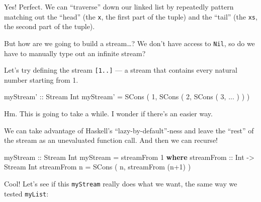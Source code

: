 \documentclass[]{article}
\newenvironment{Shaded}{}{}
\newcommand{\KeywordTok}[1]{\textcolor[rgb]{0.00,0.44,0.13}{\textbf{{#1}}}}
\newcommand{\DataTypeTok}[1]{\textcolor[rgb]{0.56,0.13,0.00}{{#1}}}
\newcommand{\DecValTok}[1]{\textcolor[rgb]{0.25,0.63,0.44}{{#1}}}
\newcommand{\OtherTok}[1]{\textcolor[rgb]{0.00,0.44,0.13}{{#1}}}
\newcommand{\FunctionTok}[1]{\textcolor[rgb]{0.02,0.16,0.49}{{#1}}}
\newcommand{\NormalTok}[1]{{#1}}
\begin{document}
Yes! Perfect. We can ``traverse'' down our linked list by repeatedly
pattern matching out the ``head'' (the \texttt{x}, the first part of the
tuple) and the ``tail'' (the \texttt{xs}, the second part of the tuple).

But how are we going to build a stream\ldots{}? We don't have access to
\texttt{Nil}, so do we have to manually type out an infinite stream?

Let's try defining the stream \texttt{{[}1..{]}} --- a stream that
contains every natural number starting from 1.

\begin{Shaded}
\begin{Highlighting}[]
\OtherTok{myStream' ::} \DataTypeTok{Stream} \DataTypeTok{Int}
\NormalTok{myStream' }\FunctionTok{=} \DataTypeTok{SCons} \NormalTok{( }\DecValTok{1}\NormalTok{, }\DataTypeTok{SCons} \NormalTok{( }\DecValTok{2}\NormalTok{, }\DataTypeTok{SCons} \NormalTok{( }\DecValTok{3}\NormalTok{, }\FunctionTok{...} \NormalTok{) ) )}
\end{Highlighting}
\end{Shaded}

Hm. This is going to take a while. I wonder if there's an easier way.

We can take advantage of Haskell's ``lazy-by-default''-ness and leave
the ``rest'' of the stream as an unevaluated function call. And then we
can recurse!

\begin{Shaded}
\begin{Highlighting}[]
\OtherTok{myStream ::} \DataTypeTok{Stream} \DataTypeTok{Int}
\NormalTok{myStream }\FunctionTok{=} \NormalTok{streamFrom }\DecValTok{1}
  \KeywordTok{where}
\OtherTok{    streamFrom ::} \DataTypeTok{Int} \OtherTok{->} \DataTypeTok{Stream} \DataTypeTok{Int}
    \NormalTok{streamFrom n }\FunctionTok{=} \DataTypeTok{SCons} \NormalTok{( n, streamFrom (n}\FunctionTok{+}\DecValTok{1}\NormalTok{) )}
\end{Highlighting}
\end{Shaded}

Cool! Let's see if this \texttt{myStream} really does what we want, the
same way we tested \texttt{myList}:
\end{document}
